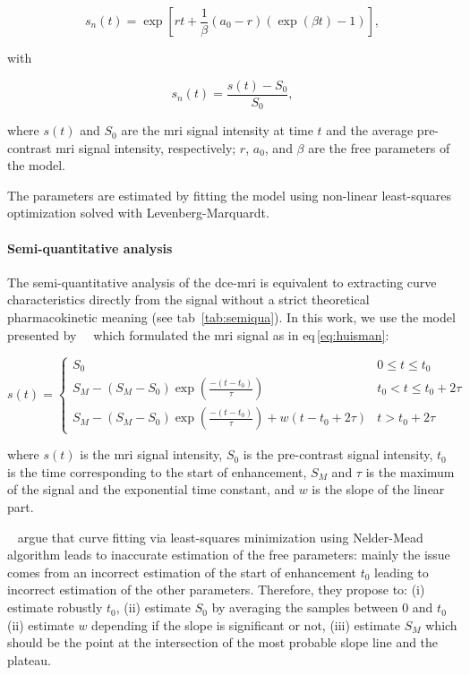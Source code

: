 \begin{equation}
  s_n(t) = \exp\left[rt + \frac{1}{\beta} \left( a_0 - r \right) \left( \exp(\beta t) - 1 \right) \right],
  \label{eq:pun2}
\end{equation}

\noindent with

\begin{equation}
  s_n(t) = \frac{s(t) - S_0}{S_0},
  \label{eq:enh}
\end{equation}

\noindent where $s(t)$ and $S_0$ are the \ac{mri} signal intensity at time $t$ and the average pre-contrast \ac{mri} signal intensity, respectively; $r$, $a_0$, and $\beta$ are the free parameters of the model.

The parameters are estimated by fitting the model using non-linear least-squares optimization solved with Levenberg-Marquardt.

\paragraph{Semi-quantitative analysis}\label{par:chp5:DCE-norm:semi}

The semi-quantitative analysis of the \ac{dce}-\ac{mri} is equivalent to extracting curve characteristics directly from the signal without a strict theoretical pharmacokinetic meaning (see \acs{tab}~\ref{tab:semiqua}).
In this work, we use the model presented by~\citeauthor{huisman2001accurate}~\cite{huisman2001accurate} which formulated the \ac{mri} signal as in \acs{eq}\,\eqref{eq:huisman}:

\begin{equation}
  s(t) = \begin{cases}
    S_0 & 0 \leq t \leq t_0 \\
    S_M - (S_M - S_0) \exp\left( \frac{-(t - t_0)}{\tau} \right) & t_0 < t \leq t_0 + 2 \tau \\
    S_M - (S_M - S_0) \exp\left( \frac{-(t - t_0)}{\tau} \right) + w(t - t_0 + 2 \tau) & t > t_0 + 2 \tau
  \end{cases}
  \label{eq:huisman}
\end{equation}

\noindent where $s(t)$ is the \ac{mri} signal intensity, $S_0$ is the pre-contrast signal intensity, $t_0$ is the time corresponding to the start of enhancement, $S_M$ and $\tau$ is the maximum of the signal and the exponential time constant, and $w$ is the slope of the linear part.

\citeauthor{huisman2001accurate}~\cite{huisman2001accurate} argue that curve fitting via least-squares minimization using Nelder-Mead algorithm leads to inaccurate estimation of the free parameters: mainly the issue comes from an incorrect estimation of the start of enhancement $t_0$ leading to incorrect estimation of the other parameters.
Therefore, they propose to:
(i) estimate robustly $t_0$,
(ii) estimate $S_0$ by averaging the samples between $0$ and $t_0$
(ii) estimate $w$ depending if the slope is significant or not,
(iii) estimate $S_M$ which should be the point at the intersection of the most probable slope line and the plateau.

